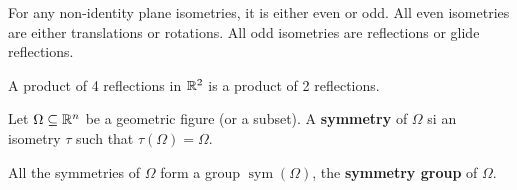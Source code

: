 \begin{corollary}
    For any non-identity plane isometries, it is either even or odd. All even isometries are either translations or rotations. All odd isometries are reflections or glide reflections.
\end{corollary}

\begin{theorem}
    A product of 4 reflections in \(\mathbb{R}^2\) is a product of 2 reflections.
\end{theorem}

\begin{definition}
    Let \(\Omega \subseteq \mathbb{R}^n\) be a geometric figure (or a subset). A \textbf{symmetry} of \(\Omega\) si an isometry \(\tau\) such that \(\tau(\Omega) = \Omega\).

    All the symmetries of \(\Omega\) form a group \(\operatorname{sym}(\Omega)\), the \textbf{symmetry group} of \(\Omega\).
\end{definition}

\newpage